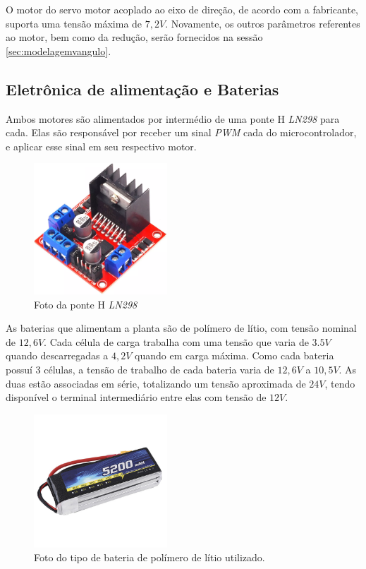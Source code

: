     	    O motor do servo motor acoplado ao eixo de direção, de acordo com a fabricante, suporta uma tensão máxima de $7,2V$. Novamente, os outros parâmetros referentes ao motor, bem como da redução, serão fornecidos na sessão \ref{sec:modelagemvangulo}.
    	
    	\subsection{Eletrônica de alimentação e Baterias}
    	    
    	    Ambos motores são alimentados por intermédio de uma ponte H \textit{LN298} para cada. Elas são responsável por receber um sinal \textit{PWM} cada do microcontrolador, e aplicar esse sinal em seu respectivo motor.
    	
        	\begin{figure}[h]
                \centering
                \includegraphics[width=5cm]{Imagens/cap2/ln298.png}
                \caption{Foto da ponte H \textit{LN298}}
                \label{img:theta}
            \end{figure}
        
    	    As baterias que alimentam a planta são de polímero de lítio, com tensão nominal de $12,6V$. Cada célula de carga trabalha com uma tensão que varia de $3.5V$ quando descarregadas a $4,2V$ quando em carga máxima. Como cada bateria possuí 3 células, a tensão de trabalho de cada bateria varia de $12,6V$ a $10,5V$. As duas estão associadas em série, totalizando um tensão aproximada de $24V$, tendo disponível o terminal intermediário entre elas com tensão de $12V$.
    	
        	\begin{figure}[h]
                \centering
                \includegraphics[width=5cm]{Imagens/cap2/bateria.jpg}
                \caption{Foto do tipo de bateria de polímero de lítio utilizado.}
                \label{img:theta}
            \end{figure}
    	    
